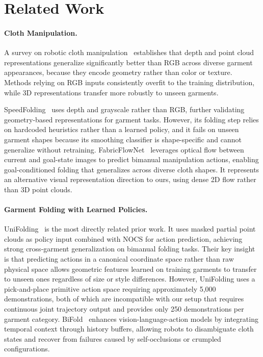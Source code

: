 \section{Related Work}

\paragraph{Cloth Manipulation.}
A survey on robotic cloth manipulation~\cite{longhini2024unfolding} establishes that depth and point cloud representations generalize significantly better than RGB across diverse garment appearances, because they encode geometry rather than color or texture. Methods relying on RGB inputs consistently overfit to the training distribution, while 3D representations transfer more robustly to unseen garments.

SpeedFolding~\cite{avigal2022speedfolding} uses depth and grayscale rather than RGB, further validating geometry-based representations for garment tasks. However, its folding step relies on hardcoded heuristics rather than a learned policy, and it fails on unseen garment shapes because its smoothing classifier is shape-specific and cannot generalize without retraining. FabricFlowNet~\cite{weng2022fabricflownet} leverages optical flow between current and goal-state images to predict bimanual manipulation actions, enabling goal-conditioned folding that generalizes across diverse cloth shapes. It represents an alternative visual representation direction to ours, using dense 2D flow rather than 3D point clouds.

\paragraph{Garment Folding with Learned Policies.}
UniFolding~\cite{unifolding2023} is the most directly related prior work. It uses masked partial point clouds as policy input combined with NOCS for action prediction, achieving strong cross-garment generalization on bimanual folding tasks. Their key insight is that predicting actions in a canonical coordinate space rather than raw physical space allows geometric features learned on training garments to transfer to unseen ones regardless of size or style differences. However, UniFolding uses a pick-and-place primitive action space requiring approximately 5,000 demonstrations, both of which are incompatible with our setup that requires continuous joint trajectory output and provides only 250 demonstrations per garment category. BiFold~\cite{bifold2025} enhances vision-language-action models by integrating temporal context through history buffers, allowing robots to disambiguate cloth states and recover from failures caused by self-occlusions or crumpled configurations.

